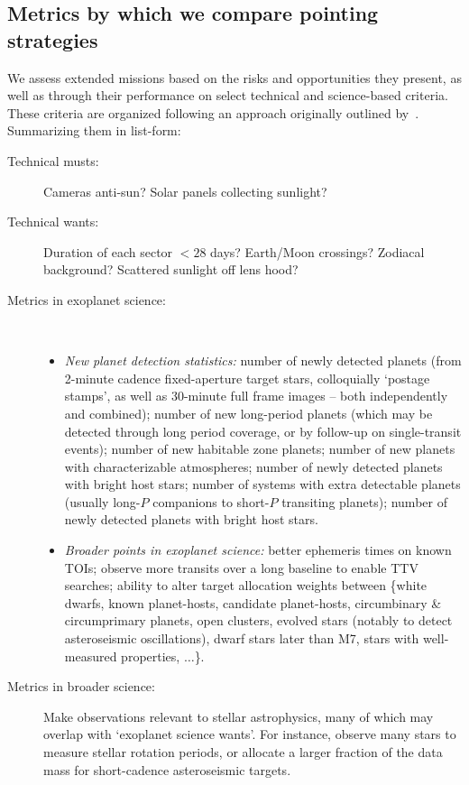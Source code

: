 \subsection{Metrics by which we compare pointing strategies}
\label{sec:comparing_pointing_strategies}

We assess extended missions based on the risks and opportunities they present, as well as through their performance on select technical and science-based criteria.
These criteria are organized following an approach originally outlined by~\citet{kepner_rational_1965}.
Summarizing them in list-form:
\begin{description}
	\item[Technical musts:] Cameras anti-sun? Solar panels collecting sunlight?
	\item[Technical wants:] Duration of each sector $<28$ days? Earth/Moon crossings? Zodiacal background? Scattered sunlight off lens hood?
	\item[Metrics in exoplanet science:]\
	\begin{itemize}
		\item \textit{New planet detection statistics:} 
		number of newly detected planets (from 2-minute cadence fixed-aperture target stars, colloquially `postage stamps', as well as 30-minute full frame images -- both independently and combined); 
		number of new long-period planets (which may be detected through long period coverage, or by follow-up on single-transit events); 
		number of new habitable zone planets; 
		number of new planets with characterizable atmospheres; 
		number of newly detected planets with bright host stars; 
		number of systems with extra detectable planets (usually long-$P$ companions to short-$P$ transiting planets);
		number of newly detected planets with bright host stars.
		\item \textit{Broader points in exoplanet science:}
		better ephemeris times on known TOIs;
		observe more transits over a long baseline to enable TTV searches; 
		ability to alter target allocation weights between \{white dwarfs, known planet-hosts, candidate planet-hosts, circumbinary \& circumprimary planets, open clusters, evolved stars (notably to detect asteroseismic oscillations), dwarf stars later than M7, stars with well-measured properties, $\ldots$\}.
	\end{itemize}
	\item[Metrics in broader science:]
	Make observations relevant to stellar astrophysics, many of which may overlap with `exoplanet science wants'. For instance, observe many stars to measure stellar rotation periods, or allocate a larger fraction of the data mass for short-cadence asteroseismic targets.

\end{description}
